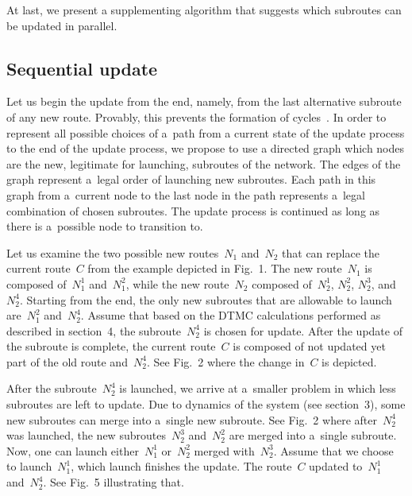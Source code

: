 \begin{multicols}{2}
At last, we present a supplementing algorithm that suggests which subroutes can 
be updated in parallel.


\vspace*{12pt}

\subsection{Sequential update}

\noindent
Let us begin the update from the end, namely, from the last alternative 
subroute of any new route. Provably, this prevents the formation of 
cycles~\cite{delaet_seamless_2015}. In order to represent all possible choices 
of a~path from a current state of the update process to the end of the update process, 
we propose to use a directed graph which nodes are the new, legitimate for launching, 
subroutes of the network. The edges of the graph represent a~legal order of launching 
new subroutes. Each path in this graph from a~current node to the last node in 
the path represents a~legal combination of chosen subroutes. The update process is 
continued as long as there is a~possible node to transition to. 

Let us examine the two possible new routes~$N_1$ and~$N_2$ that can replace the 
current route~$C$ from the example depicted in Fig.~1. 
The new route~$N_1$ is composed of~$N^1_1$ and~$N^2_1$, while the new route~$N_2$ 
composed of~$N^1_2$, $N^2_2$, $N^3_2$, and~$N^4_2$. Starting from the end, the only 
new subroutes that are allowable to launch are~$N^2_1$ and~$N^4_2$. 
Assume that based on the DTMC calculations performed as described in section~4, 
the subroute~$N^4_2$ is chosen for update. After the update of the subroute is 
complete, the current route~$C$ is composed of not updated yet part of the old 
route and~$N^4_2$. See Fig.~2 where the change in~$C$ 
is depicted.

After the subroute~$N^4_2$ is launched, we arrive at a~smaller problem in which 
less subroutes are left to update. Due to dynamics of the system 
(see section~3), some new subroutes can merge into a~single new subroute.
See Fig.~2 where after~$N^4_2$ was launched, the 
new subroutes~$N^3_2$ and~$N^2_2$ are merged into a~single subroute. Now, one 
can launch either~$N^1_1$ or~$N^2_2$ merged with~$N^3_2$. Assume that we choose to 
launch~$N^1_1$, which launch
 finishes the update. The route~$C$ updated to~$N^1_1$ 
and~$N^4_2$. See Fig.~5 illustrating that.



\end{multicols}
